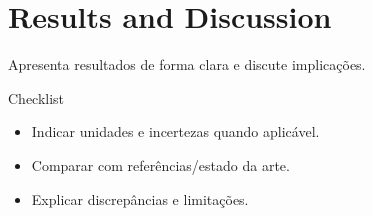 \section{Results and Discussion}
\label{sec:results}

Apresenta resultados de forma clara e discute implicações.

\begin{exampleblock}{Checklist}
\begin{itemize}
  \item Indicar unidades e incertezas quando aplicável.
  \item Comparar com referências/estado da arte.
  \item Explicar discrepâncias e limitações.
\end{itemize}
\end{exampleblock}
